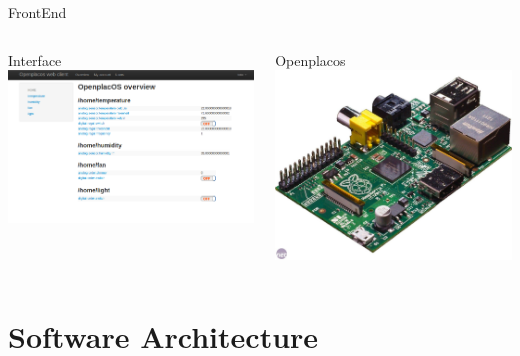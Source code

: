 \documentclass{beamer}
\begin{document}
\begin{frame}{FrontEnd}
\begin{columns}
\begin{column}[l]{0.5\textwidth}
Interface
\includegraphics[width=\columnwidth]{figures/opos-overview.png}
\end{column}
\begin{column}[r]{0.5\textwidth}
Openplacos \\
\includegraphics[width=0.3\columnwidth]{figures/raspi.jpg}
\end{column}
\end{columns}
\end{frame}

\section{Software Architecture}
\end{document}

